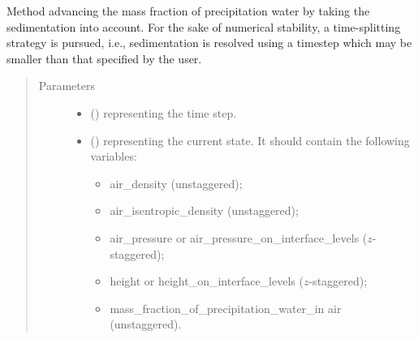 \documentclass[letterpaper,10pt,english]{sphinxmanual}
\begin{document}
\begin{fulllineitems}
\begin{fulllineitems}
\end{fulllineitems}


\begin{fulllineitems}
\label{\detokenize{api:tasmania.dycore.prognostic_isentropic_centered.PrognosticIsentropicCentered.step_integrating_sedimentation_flux}}
Method advancing the mass fraction of precipitation water by taking the sedimentation into account.
For the sake of numerical stability, a time-splitting strategy is pursued, i.e., sedimentation is resolved
using a timestep which may be smaller than that specified by the user.
\begin{quote}\begin{description}
\item[{Parameters}] \leavevmode\begin{itemize}
\item {} 
 () \textendash{}  representing the time step.

\item {} 
 () \textendash{} 
{\hyperref[\detokenize{api:tasmania.storages.state_isentropic.StateIsentropic}]{}} representing the current state.
It should contain the following variables:
\begin{itemize}
\item {} 
air\_density (unstaggered);

\item {} 
air\_isentropic\_density (unstaggered);

\item {} 
air\_pressure or air\_pressure\_on\_interface\_levels (\(z\)-staggered);

\item {} 
height or height\_on\_interface\_levels (\(z\)-staggered);

\item {} 
mass\_fraction\_of\_precipitation\_water\_in air (unstaggered).

\end{itemize}



\end{itemize}
\end{description}
\end{quote}
\end{fulllineitems}
\end{fulllineitems}
\end{document}
